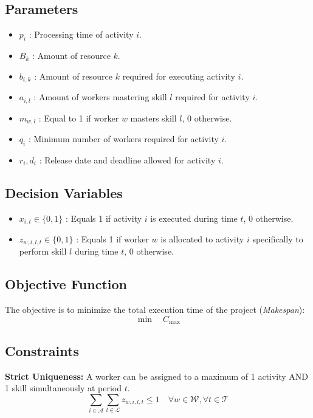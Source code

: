 \documentclass[preprint, authoryear,11pt]{elsarticle}
\begin{document}
\subsection{Parameters}
\begin{itemize}
    \item $p_i$ : Processing time of activity $i$.
    \item $B_k$ : Amount of resource $k$.
    \item $b_{i,k}$ : Amount of resource $k$ required for executing activity $i$.
    \item $a_{i,l}$ : Amount of workers mastering skill $l$ required for activity $i$.
    \item $m_{w,l}$ : Equal to 1 if worker $w$ masters skill $l$, 0 otherwise.
    \item $q_i$ : Minimum number of workers required for activity $i$.
    \item $r_i, d_i$ : Release date and deadline allowed for activity $i$.
\end{itemize}

\subsection{Decision Variables}
\begin{itemize}
    \item $x_{i,t} \in \{0, 1\}$ : Equals 1 if activity $i$ is executed during time $t$, 0 otherwise.
    \item $z_{w,i,l,t} \in \{0, 1\}$ : Equals 1 if worker $w$ is allocated to activity $i$ specifically to perform skill $l$ during time $t$, 0 otherwise.
\end{itemize}

\subsection{Objective Function}
The objective is to minimize the total execution time of the project (\textit{Makespan}):
\begin{equation}
    \min \quad C_{\max}
\end{equation}

\subsection{Constraints}

\noindent \textbf{Strict Uniqueness:} A worker can be assigned to a maximum of 1 activity AND 1 skill simultaneously at period $t$.
\begin{equation}
    \sum_{i \in \mathcal{A}} \sum_{l \in \mathcal{L}} z_{w,i,l,t} \leq 1 \quad \forall w \in \mathcal{W}, \forall t \in \mathcal{T}
\end{equation}
\end{document}
